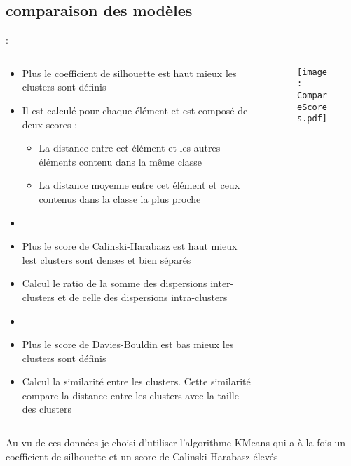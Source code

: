 \documentclass[8pt,aspectratio=169,hyperref={unicode=true}]{beamer}
\begin{document}
\subsection{comparaison des modèles}
\begin{frame}{\insertsection: \insertsubsection}
    \begin{columns}
        \begin{column}{.6\textwidth}
            \begin{itemize}
                \item Plus le coefficient de silhouette est haut mieux les clusters sont définis
                \item Il est calculé pour chaque élément et est composé de deux scores :
                \begin{itemize}
                    \item La distance entre cet élément et les autres éléments contenu dans la même classe
                    \item La distance moyenne entre cet élément et ceux contenus dans la classe la plus proche
                \end{itemize}
                \item[]
                \item Plus le score de Calinski-Harabasz est haut mieux lest clusters sont denses et bien séparés
                \item Calcul le ratio de la somme des dispersions inter-clusters et de celle des dispersions intra-clusters
                \item[] 
                \item Plus le score de Davies-Bouldin est bas mieux les clusters sont définis
                \item Calcul la similarité entre les clusters. Cette similarité compare la distance entre les clusters avec la taille des clusters
            \end{itemize}
        \end{column}
        \begin{column}{.4\textwidth}
            \begin{figure}
                \texttt{[image: CompareScores.pdf]}
            \end{figure}
        \end{column}
    \end{columns}
    Au vu de ces données je choisi d'utiliser l'algorithme KMeans qui a à la fois un coefficient de silhouette et un score de Calinski-Harabasz élevés
\end{frame}
\end{document}

